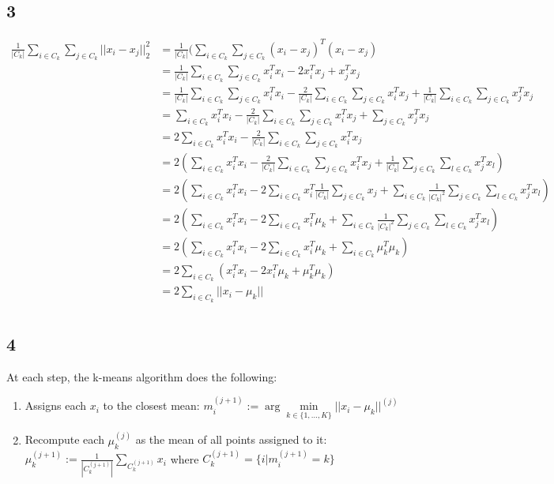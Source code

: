 \documentclass[twoside]{Homework}
\begin{document}
\subsection*{3}
\begin{align*}
\frac{1}{|C_k|}\sum_{i \in C_k}\sum_{j \in C_k} ||x_i - x_j||_2^2
&= \frac{1}{|C_k|}(\sum_{i \in C_k}\sum_{j \in C_k} (x_i - x_j)^T (x_i - x_j)\\
&= \frac{1}{|C_k|}\sum_{i \in C_k}\sum_{j \in C_k} x_i^T x_i - 2 x_i^T x_j +  x_j^T x_j\\
&= \frac{1}{|C_k|}\sum_{i \in C_k}\sum_{j \in C_k} x_i^T x_i - \frac{2}{|C_k|}\sum_{i \in C_k}\sum_{j \in C_k} x_i^T x_j +  \frac{1}{|C_k|}\sum_{i \in C_k}\sum_{j \in C_k} x_j^T x_j\\
&= \sum_{i \in C_k} x_i^T x_i - \frac{2}{|C_k|}\sum_{i \in C_k}\sum_{j \in C_k} x_i^T x_j + \sum_{j \in C_k} x_j^T x_j\\
&= 2 \sum_{i \in C_k} x_i^T x_i - \frac{2}{|C_k|}\sum_{i \in C_k}\sum_{j \in C_k} x_i^T x_j\\
&= 2 (\sum_{i \in C_k} x_i^T x_i - \frac{2}{|C_k|}\sum_{i \in C_k}\sum_{j \in C_k} x_i^T x_j + \frac{1}{|C_k|}\sum_{j \in C_k}\sum_{l \in C_k} x_j^T x_l)\\
&= 2 (\sum_{i \in C_k} x_i^T x_i - 2\sum_{i \in C_k} x_i^T \frac{1}{|C_k|}\sum_{j \in C_k} x_j + \sum_{i \in C_k} \frac{1}{|C_k|^2} \sum_{j \in C_k}\sum_{l \in C_k} x_j^T x_l)\\
&= 2 (\sum_{i \in C_k} x_i^T x_i - 2\sum_{i \in C_k} x_i^T \mu_k + \sum_{i \in C_k} \frac{1}{|C_k|^2} \sum_{j \in C_k}\sum_{l \in C_k} x_j^T x_l)\\
&= 2 (\sum_{i \in C_k} x_i^T x_i - 2\sum_{i \in C_k} x_i^T \mu_k + \sum_{i \in C_k} \mu_k^T \mu_k)\\
&= 2 \sum_{i \in C_k} (x_i^T x_i - 2 x_i^T \mu_k + \mu_k^T \mu_k)\\
&= 2 \sum_{i \in C_k} ||x_i - \mu_k||\\
\end{align*}

\subsection*{4}
At each step, the k-means algorithm does the following: 
\begin{enumerate}
\item Assigns each $x_i$ to the closest mean: $m_i^{(j+1)} := \arg \underset{k \in \{1, ..., K\}}{\min} ||x_i - \mu_k||^{(j)}$
\item Recompute each $\mu_k^{(j)}$ as the mean of all points assigned to it: $\mu_k^{(j+1)} := \frac{1}{|C_k^{(j+1)}|} \sum_{C_k^{(j+1)}} x_i$ where $C_k^{(j+1)} = \{i|m_i^{(j+1)} = k\}$
\end{enumerate}
\end{document}

